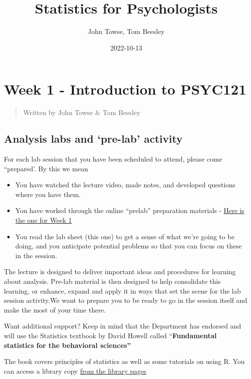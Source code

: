 \documentclass[
]{book}
\title{Statistics for Psychologists}
\author{John Towse, Tom Beesley}
\date{2022-10-13}
\begin{document}
\maketitle

{
\setcounter{tocdepth}{1}
\tableofcontents
}
\hypertarget{week-1---introduction-to-psyc121}{%
\chapter{Week 1 - Introduction to PSYC121}\label{week-1---introduction-to-psyc121}}

\begin{quote}
Written by John Towse \& Tom Beesley
\end{quote}

\hypertarget{analysis-labs-and-pre-lab-activity}{%
\section{Analysis labs and `pre-lab' activity}\label{analysis-labs-and-pre-lab-activity}}

For each lab session that you have been scheduled to attend, please come ``prepared'. By this we mean

\begin{itemize}
\item
  You have watched the lecture video, made notes, and developed questions where you have them.
\item
  You have worked through the online ``prelab'' preparation materials - \href{https://ma-rconnect.lancs.ac.uk/Week_1_prep}{Here is the one for Week 1}
\item
  You read the lab sheet (this one) to get a sense of what we're going to be doing, and you anticipate potential problems so that you can focus on these in the session.
\end{itemize}

The lecture is designed to deliver important ideas and procedures for learning about analysis. Pre-lab material is then designed to help consolidate this learning, or enhance, expand and apply it in ways that set the scene for the lab session activity.We want to prepare you to be ready to go in the session itself and make the most of your time there.

Want additional support? Keep in mind that the Department has endorsed and will use the Statistics textbook by David Howell called ``\textbf{Fundamental statistics for the behavioral sciences''}

The book covers principles of statistics as well as some tutorials on using R. You can access a library copy \href{https://onesearch.lancaster-university.uk/permalink/f/cssk39/44LAN_ALMA_DS51180136050001221}{from the library pages}
\end{document}
